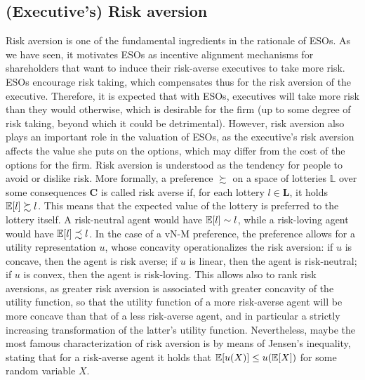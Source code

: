 \subsection{(Executive's) Risk aversion} %
    Risk aversion is one of the fundamental ingredients in the rationale of ESOs. As we have seen, it motivates ESOs as incentive alignment mechanisms for shareholders that want to induce their risk-averse executives to take more risk. ESOs encourage risk taking, which compensates thus for the risk aversion of the executive. Therefore, it is expected that with ESOs, executives will take more risk than they would otherwise, which is desirable for the firm (up to some degree of risk taking, beyond which it could be detrimental). However, risk aversion also plays an important role in the valuation of ESOs, as the executive's risk aversion affects the value she puts on the options, which may differ from the cost of the options for the firm.
    Risk aversion is understood as the tendency for people to avoid or dislike risk. More formally, a preference $\succsim$ on a space of lotteries $\mathbb{L}$ over some consequences $\mathbf{C}$ is called risk averse if, for each lottery $l \in \mathbf{L}$, it holds $\operatorname{\mathbb{E}}[l] \succsim l$. This means that the expected value of the lottery is preferred to the lottery itself. A risk-neutral agent would have $\operatorname{\mathbb{E}}[l] \sim l$, while a risk-loving agent would have $\operatorname{\mathbb{E}}[l] \precsim l$. In the case of a vN-M preference, the preference allows for a utility representation $u$, whose concavity operationalizes the risk aversion: if $u$ is concave, then the agent is risk averse; if $u$ is linear, then the agent is risk-neutral; if $u$ is convex, then the agent is risk-loving. This allows also to rank risk aversions, as greater risk aversion is associated with greater concavity of the utility function, so that the utility function of a more risk-averse agent will be more concave than that of a less risk-averse agent, and in particular a strictly increasing transformation of the latter's utility function. Nevertheless, maybe the most famous characterization of risk aversion is by means of Jensen's inequality, stating that for a risk-averse agent it holds that $\operatorname{\mathbb{E}}[u(X)] \leq u(\operatorname{\mathbb{E}}[X])$ for some random variable $X$.
